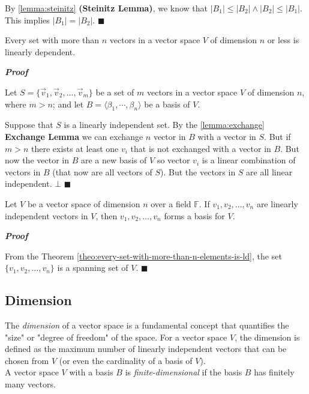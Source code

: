 By \ref{lemma:steinitz} \textbf{(Steinitz Lemma)}, we know that $|B_1| \leq |B_2| \land |B_2| \leq |B_1|$. This implies $|B_1| = |B_2|$.
$\blacksquare$

\begin{theorem}
    Every set with more than $n$ vectors in a vector space $V$ of dimension $n$ or less is linearly dependent.
    \label{theo:every-set-with-more-than-n-elements-is-ld}
\end{theorem}

\textbf{\textit{Proof}}

Let $S = \{\vec{v}_1, \vec{v}_2, ..., \vec{v}_m\}$ be a set of $m$ vectors in a vector space $V$ of dimension $n$, where $m > n$; and let $B=\langle \beta_1, \cdots, \beta_n\rangle$ be a basis of $V$.

Suppose that $S$ is a linearly independent set. By the \ref{lemma:exchange} \textbf{Exchange Lemma} we can exchange $n$ vector in $B$ with a vector in $S$. But if $m>n$ there exists at least one $v_i$ that is not exchanged with a vector in $B$. But now the vector in $B$ are a new basis of $V$ so vector $v_i$ is a linear combination of vectors in $B$ (that now are all vectors of $S$). But the vectors in $S$ are all linear independent. $\bot$
$\blacksquare$

\begin{theorem}
    Let $V$ be a vector space of dimension $n$ over a field $\mathbb F$. If $v_1, v_2, \ldots, v_n$ are linearly independent vectors in $V$, then ${v_1, v_2, \ldots, v_n}$ forms a basis for $V$.
\end{theorem}

\textbf{\textit{Proof}}

From the Theorem \ref{theo:every-set-with-more-than-n-elements-is-ld}, the set $\{v_1, v_2, \ldots, v_n\}$ is a spanning set of $V$. $\blacksquare$

\subsection{Dimension}

The \emph{dimension} of a vector space is a fundamental concept that quantifies the "size" or "degree of freedom" of the space. For a vector space $V$, the dimension is defined as the maximum number of linearly independent vectors that can be chosen from $V$ (or even the cardinality of a basis of $V$). 
\\

A vector space $V$ with a basis $B$ is \emph{finite-dimensional} if the basis $B$ has finitely many vectors.
